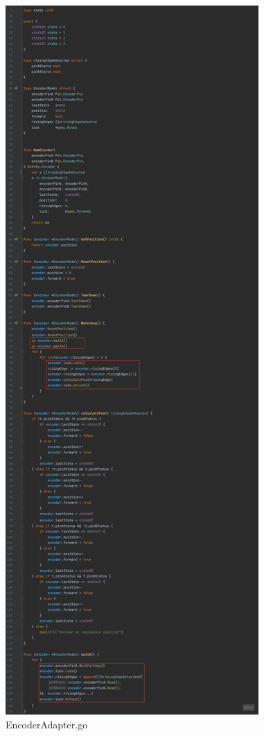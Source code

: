 \begin{figure}[H]
    \centering
    \includegraphics[height=0.95\textheight]{./part/Ejecucion/Seguimiento/PidControl/img/PFM - Encoder}
    \caption{EncoderAdapter.go}\label{fig:EncoderAdapter}
\end{figure}